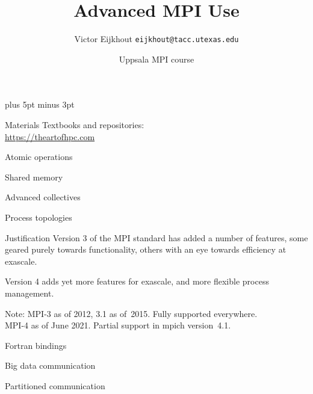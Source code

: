 \documentclass[11pt,headernav]{beamer}
\newcounter{tacc}
\def\Location{}%
\def\courseyear{2021}
\def\Location{TACC APP institute MPI training \courseyear}
\def\Location{TACC MPI training \courseyear}
\def\Location{Uppsala MPI course}
\begin{document}
\parskip=10pt plus 5pt minus 3pt

\title{Advanced MPI Use}
\author{Victor Eijkhout {\tt eijkhout@tacc.utexas.edu}}
\date{\Location}

\begin{frame}
  \titlepage
\end{frame}


\begin{download}
  \begin{frame}[containsverbatim]{Materials}
    Textbooks and repositories:\\
    \url{https://theartofhpc.com}
  \end{frame}
\end{download}

 {Atomic operations}

%
 
 {Shared memory}


 {Advanced collectives}


 {Process topologies}



\begin{frame}{Justification}
  Version 3 of the MPI standard has added a number
  of features, some geared purely towards functionality,
  others with an eye towards efficiency at exascale.

  Version 4 adds yet more features for exascale,
  and more flexible process management.

  Note: MPI-3 as of 2012, 3.1 as of~2015. Fully supported everywhere.\\
  MPI-4 as of June 2021. Partial support in mpich version~4.1.
\end{frame}

 {Fortran bindings}


 {Big data communication}


 {Partitioned communication}

\end{document}
